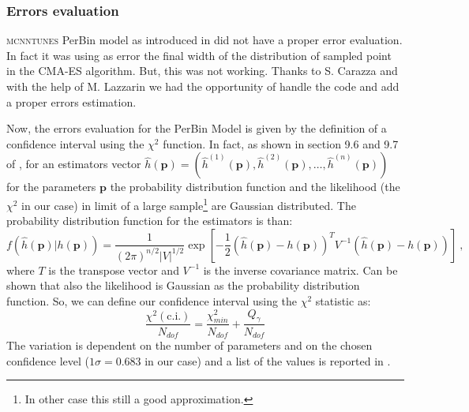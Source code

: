 \subsubsection{Errors evaluation}

\textsc{mcnntunes} PerBin model as introduced in \cite{MCNNTUNESarticle} did not have a proper error evaluation. In fact it was using as error the final width of the distribution of sampled point in the CMA-ES algorithm. But, this was not working. Thanks to S. Carazza and with the help of M. Lazzarin we had the opportunity of handle the code and add a proper errors estimation.

Now, the errors evaluation for the PerBin Model is given by the definition of a confidence interval using the $\chi^2$ function.
In fact, as shown in section 9.6 and 9.7 of \cite{cowan}, for an estimators vector $\hat{h}(\mathbf{p})=(\hat{h}^{(1)}(\mathbf{p}),\hat{h}^{(2)}(\mathbf{p}),\dots,\hat{h}^{(n)}(\mathbf{p}))$ for the parameters $\mathbf{p}$ the probability distribution function and the likelihood (the $\chi^2$ in our case) in limit of a large sample\footnote{In other case this still a good approximation.} are Gaussian distributed. The probability distribution function for the estimators is than:
\begin{equation}
f(\hat{h}(\mathbf{p})|h(\mathbf{p})) = \frac{1}{(2\pi)^{n/2}|V|^{1/2}}\exp\left[ -\frac{1}{2}\left(\hat{h}(\mathbf{p}) - h(\mathbf{p})\right)^T V^{-1} \left(\hat{h}(\mathbf{p}) - h(\mathbf{p})\right) \right] \ ,
\end{equation}
where $T$ is the transpose vector and $V^{-1}$ is the inverse covariance matrix. 
Can be shown that also the likelihood is Gaussian as the probability distribution function. 
So, we can define our confidence interval using the $\chi^2$ statistic as: 
\begin{equation}
	\frac{\chi^2(\text{c.i.})}{N_{dof}}= \frac{\chi^2_{min}}{N_{dof}}+\frac{Q_\gamma}{N_{dof}}
	\label{eq:chi2_variation}
\end{equation} 
The variation is dependent on the number of parameters and on the chosen confidence level ($1\sigma=0.683$ in our case) and a list of the values is reported in .

